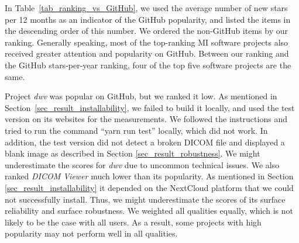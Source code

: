 \documentclass[final, 3p, times, authoryear]{elsarticle}
\begin{document}
In Table~\ref{tab_ranking_vs_GitHub}, we used the average number of new stars
per 12 months as an indicator of the GitHub popularity, and listed the items in
the descending order of this number. We ordered the non-GitHub items by our
ranking. Generally speaking, most of the top-ranking MI software projects also
received greater attention and popularity on GitHub. Between our ranking and the
GitHub stars-per-year ranking, four of the top five software projects are the
same.

Project \textit{dwv} was popular on GitHub, but we ranked it low. As mentioned
in Section~\ref{sec_result_installability}, we failed to build it locally, and
used the test version on its websites for the measurements. We followed the
instructions and tried to run the command ``yarn run test'' locally, which did
not work. In addition, the test version did not detect a broken DICOM file and
displayed a blank image as described in Section \ref{sec_result_robustness}. We
might underestimate the scores for \textit{dwv} due to uncommon technical
issues. We also ranked \textit{DICOM Viewer} much lower than its popularity. As
mentioned in Section \ref{sec_result_installability} it depended on the
NextCloud platform that we could not successfully install. Thus, we might
underestimate the scores of its surface reliability and surface
robustness. We weighted all qualities equally, which is not likely to be the
case with all users. As a result, some projects with high popularity may not
perform well in all qualities.
\end{document}
